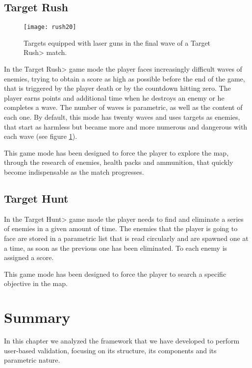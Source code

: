 \subsection{Target Rush}

\begin{figure}
\centering
\texttt{[image: rush20]}
\caption{Targets equipped with laser guns in the final wave of a \<Target Rush> match.}
\label{fig:targets}
\end{figure}

In the \<Target Rush> game mode the player faces increasingly difficult waves of enemies, trying to obtain a score as high as possible before the end of the game, that is triggered by the player death or by the countdown hitting zero. The player earns points and additional time when he destroys an enemy or he completes a wave. The number of waves is parametric, as well as the content of each one. By default, this mode has twenty waves and uses targets as enemies, that start as harmless but became more and more numerous and dangerous with each wave (see figure \ref{fig:targets}). 

\par

This game mode has been designed to force the player to explore the map, through the research of enemies, health packs and ammunition, that quickly become indispensable as the match progresses.

\subsection{Target Hunt}

In the \<Target Hunt> game mode the player needs to find and eliminate a series of enemies in a given amount of time. The  enemies that the player is going to face are stored in a parametric list that is read circularly and are spawned one at a time, as soon as the previous one has been eliminated. To each enemy is assigned a score.

\par

This game mode has been designed to force the player to search a specific objective in the map.

\section{Summary}

In this chapter we analyzed the framework that we have developed to perform user-based validation, focusing on its structure, its components and its parametric nature.